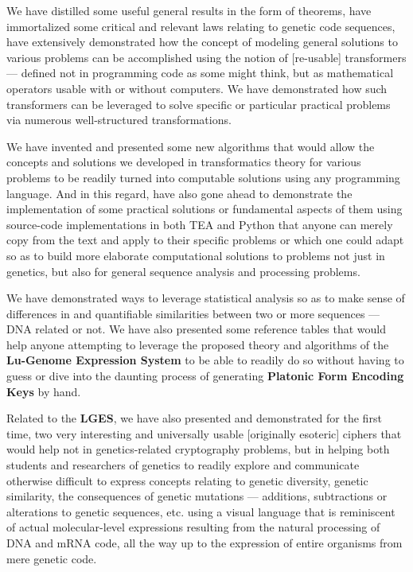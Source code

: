 \documentclass[a4paper, 18pt]{book} %
\begin{document}
We have distilled some useful general results in the form of theorems, have immortalized some critical and relevant laws relating to genetic code sequences, have extensively demonstrated how the concept of modeling general solutions to various problems can be accomplished using the notion of [re-usable] transformers --- defined not in programming code as some might think, but as mathematical operators usable with or without computers. We have demonstrated how such transformers can be leveraged to solve specific or particular practical problems via numerous well-structured transformations. 

We have invented and presented some new algorithms that would allow the concepts and solutions we developed in transformatics theory for various problems to be readily turned into computable solutions using any programming language. And in this regard, have also gone ahead to demonstrate the implementation of some practical solutions or fundamental aspects of them using source-code implementations in both TEA and Python that anyone can merely copy from the text and apply to their specific problems or which one could adapt so as to build more elaborate computational solutions to problems not just in genetics, but also for general sequence analysis and processing problems. 

We have demonstrated ways to leverage statistical analysis so as to make sense of differences in and quantifiable similarities between two or more sequences --- DNA related or not. We have also presented some reference tables that would help anyone attempting to leverage the proposed theory and algorithms of the \textbf{Lu-Genome Expression System} to be able to readily do so without having to guess or dive into the daunting process of generating \textbf{Platonic Form Encoding Keys} by hand. 

Related to the \textbf{LGES}, we have also presented and demonstrated for the first time, two very interesting and universally usable [originally esoteric] ciphers that would help not in genetics-related cryptography problems, but in helping both students and researchers of genetics to readily explore and communicate otherwise difficult to express concepts relating to genetic diversity, genetic similarity, the consequences of genetic mutations --- additions, subtractions or alterations to genetic sequences, etc. using a visual language that is reminiscent of actual molecular-level expressions resulting from the natural processing of DNA and mRNA code, all the way up to the expression of entire organisms from mere genetic code. 
\end{document}
